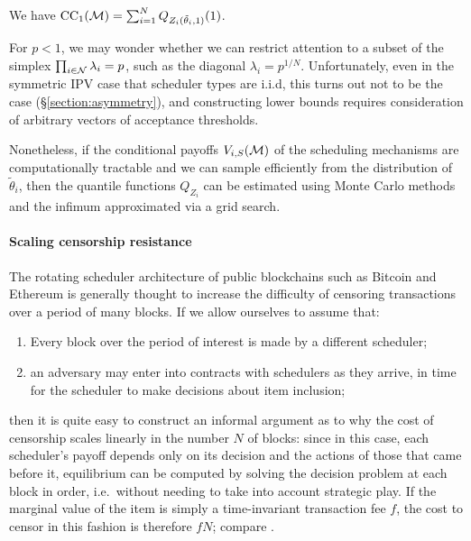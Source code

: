\begin{corollary}

  We have $\mathrm{CC}_{1}(\mathcal{M}) = \sum_{i=1}^N Q_{Z_i(\tilde\theta_i,1)}(1)$.

\end{corollary}

For $p<1$, we may wonder whether we can restrict attention to a subset of the simplex $\prod_{i\in\mathcal{N}}\lambda_i=p$, such as the diagonal $\lambda_i = p^{1/N}$.
%
Unfortunately, even in the symmetric IPV case that scheduler types are i.i.d, this turns out not to be the case (\S\ref{section:asymmetry}), and constructing lower bounds requires consideration of arbitrary vectors of acceptance thresholds.

Nonetheless, if the conditional payoffs $V_{i,S}(\mathcal{M})$ of the scheduling mechanisms are computationally tractable and we can sample efficiently from the distribution of $\tilde\theta_i$, then the quantile functions $Q_{Z_i}$ can be estimated using Monte Carlo methods and the infimum approximated via a grid search.

\paragraph{Scaling censorship resistance}

The rotating scheduler architecture of public blockchains such as Bitcoin and Ethereum is generally thought to increase the difficulty of censoring transactions over a period of many blocks.
%
If we allow ourselves to assume that:
%
\begin{enumerate}
  \item Every block over the period of interest is made by a different scheduler;
  \item an adversary may enter into contracts with schedulers as they arrive, in time for the scheduler to make decisions about item inclusion;
\end{enumerate}
%
then it is quite easy to construct an informal argument as to why the cost of censorship scales linearly in the number $N$ of blocks: since in this case, each scheduler's payoff depends only on its decision and the actions of those that came before it, equilibrium can be computed by solving the decision problem at each block in order, i.e.~without needing to take into account strategic play.
%
If the marginal value of the item is simply a time-invariant transaction fee $f$, the cost to censor in this fashion is therefore $fN$; compare \cite[Ex.~2]{FPR}.

